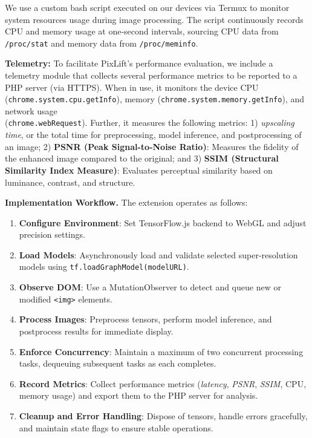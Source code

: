 \documentclass[acmsmall]{acmart}
\newcommand{\tool}{{PixLift}\xspace}
\begin{document}
We use a custom bash script executed on our devices via Termux to monitor system resources usage during image processing. The script continuously records CPU and memory usage at one-second intervals, sourcing CPU data from \texttt{/proc/stat} and memory data from \texttt{/proc/meminfo}. 

 
\vspace{0.05in}
\noindent
\textbf{Telemetry:} To facilitate \tool's performance evaluation, we include a telemetry module that collects several performance metrics to be reported to a PHP server (via HTTPS). When in use, it monitors the device CPU (\texttt{chrome.system.cpu.getInfo}), memory (\texttt{chrome.system.memory.getInfo}), and network usage\\(\texttt{chrome.webRequest}). Further, it measures the following metrics: 1) \textit{upscaling time}, or the total time for preprocessing, model inference, and postprocessing of an image; 2) \textbf{PSNR (Peak Signal-to-Noise Ratio)}: Measures the fidelity of the enhanced image compared to the original; and 3) \textbf{SSIM (Structural Similarity Index Measure)}: Evaluates perceptual similarity based on luminance, contrast, and structure. 


\vspace{0.05in}
\noindent
\textbf{Implementation Workflow.} The extension operates as follows:
\begin{enumerate}
    \item \textbf{Configure Environment}: Set TensorFlow.js backend to WebGL and adjust precision settings.
    
    \item \textbf{Load Models}: Asynchronously load and validate selected super-resolution models using \texttt{tf.loadGraphModel(modelURL)}.
    
    \item \textbf{Observe DOM}: Use a MutationObserver to detect and queue new or modified \texttt{<img>} elements.
    
    \item \textbf{Process Images}: Preprocess tensors, perform model inference, and postprocess results for immediate display.
    
    \item \textbf{Enforce Concurrency}: Maintain a maximum of two concurrent processing tasks, dequeuing subsequent tasks as each completes.
    
    \item \textbf{Record Metrics}: Collect performance metrics (\textit{latency}, \textit{PSNR}, \textit{SSIM}, CPU, memory usage) and export them to the PHP server for analysis.
    
    \item \textbf{Cleanup and Error Handling}: Dispose of tensors, handle errors gracefully, and maintain state flags to ensure stable operations.
\end{enumerate}
\end{document}
